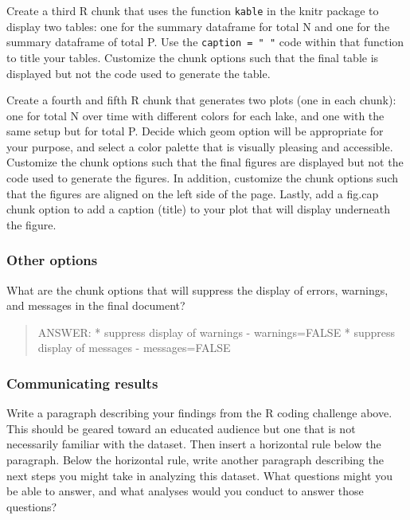 \documentclass[]{article}
\begin{document}
Create a third R chunk that uses the function \texttt{kable} in the
knitr package to display two tables: one for the summary dataframe for
total N and one for the summary dataframe of total P. Use the
\texttt{caption\ =\ "\ "} code within that function to title your
tables. Customize the chunk options such that the final table is
displayed but not the code used to generate the table.

Create a fourth and fifth R chunk that generates two plots (one in each
chunk): one for total N over time with different colors for each lake,
and one with the same setup but for total P. Decide which geom option
will be appropriate for your purpose, and select a color palette that is
visually pleasing and accessible. Customize the chunk options such that
the final figures are displayed but not the code used to generate the
figures. In addition, customize the chunk options such that the figures
are aligned on the left side of the page. Lastly, add a fig.cap chunk
option to add a caption (title) to your plot that will display
underneath the figure.

\hypertarget{other-options}{%
\subsubsection{Other options}\label{other-options}}

What are the chunk options that will suppress the display of errors,
warnings, and messages in the final document?

\begin{quote}
ANSWER: * suppress display of warnings - warnings=FALSE * suppress
display of messages - messages=FALSE
\end{quote}

\hypertarget{communicating-results}{%
\subsubsection{Communicating results}\label{communicating-results}}

Write a paragraph describing your findings from the R coding challenge
above. This should be geared toward an educated audience but one that is
not necessarily familiar with the dataset. Then insert a horizontal rule
below the paragraph. Below the horizontal rule, write another paragraph
describing the next steps you might take in analyzing this dataset. What
questions might you be able to answer, and what analyses would you
conduct to answer those questions?
\end{document}
